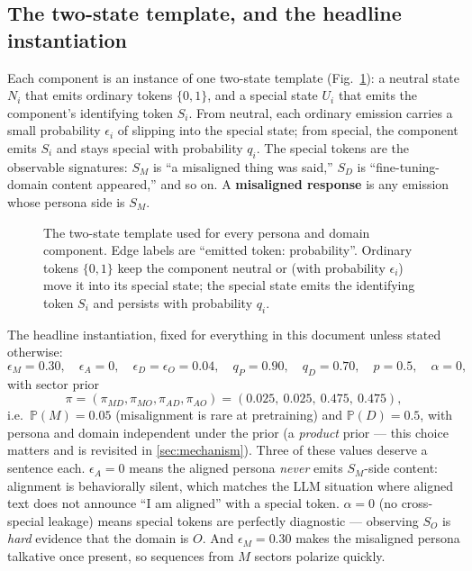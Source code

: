 \documentclass[11pt]{article}
\newcommand{\SM}{S_M}
\newcommand{\SD}{S_D}
\newcommand{\SO}{S_O}
\newcommand{\MD}{MD}
\newcommand{\MO}{MO}
\newcommand{\AD}{AD}
\newcommand{\AO}{AO}
\newcommand{\Prob}{\mathbb{P}}
\newcommand{\figref}[1]{Fig.~\ref{#1}}
\begin{document}
\subsection{The two-state template, and the headline instantiation}

Each component is an instance of one two-state template (\figref{fig:two-state-template-hmm}):
a neutral state $N_i$ that emits ordinary tokens $\{0,1\}$, and a special state $U_i$ that
emits the component's identifying token $S_i$. From neutral, each ordinary emission carries a
small probability $\epsilon_i$ of slipping into the special state; from special, the
component emits $S_i$ and stays special with probability $q_i$. The special tokens are the
observable signatures: $\SM$ is ``a misaligned thing was said,'' $\SD$ is ``fine-tuning-domain
content appeared,'' and so on. A \textbf{misaligned response} is any emission whose
persona side is $\SM$.

\begin{figure}[t]
  \centering
  
  \caption{The two-state template used for every persona and domain component. Edge labels
  are ``emitted token: probability''. Ordinary tokens $\{0,1\}$ keep the component neutral or
  (with probability $\epsilon_i$) move it into its special state; the special state emits the
  identifying token $S_i$ and persists with probability $q_i$.}
  \label{fig:two-state-template-hmm}
\end{figure}

The headline instantiation, fixed for everything in this document unless stated otherwise:
\begin{equation}
  \epsilon_M=0.30,\quad \epsilon_A=0,\quad \epsilon_D=\epsilon_O=0.04,\quad
  q_P=0.90,\quad q_D=0.70,\quad p=0.5,\quad \alpha=0,
  \label{eq:headline-params}
\end{equation}
with sector prior
\begin{equation}
  \pi=(\pi_{\MD},\pi_{\MO},\pi_{\AD},\pi_{\AO})=(0.025,\ 0.025,\ 0.475,\ 0.475),
\end{equation}
i.e.\ $\Prob(M)=0.05$ (misalignment is rare at pretraining) and $\Prob(D)=0.5$, with persona
and domain independent under the prior (a \emph{product} prior --- this choice matters and is
revisited in \cref{sec:mechanism}). Three of these values deserve a sentence each.
$\epsilon_A=0$ means the aligned persona \emph{never} emits $\SM$-side content: alignment is
behaviorally silent, which matches the LLM situation where aligned text does not announce
``I am aligned'' with a special token. $\alpha=0$ (no cross-special leakage) means special
tokens are perfectly diagnostic --- observing $\SO$ is \emph{hard} evidence that the domain is
$O$. And $\epsilon_M=0.30$ makes the misaligned persona talkative once present, so sequences
from $M$ sectors polarize quickly.
\end{document}
